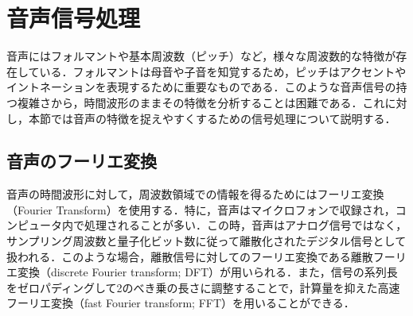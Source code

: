 \section{音声信号処理}
音声にはフォルマントや基本周波数（ピッチ）など，様々な周波数的な特徴が存在している．フォルマントは母音や子音を知覚するため，ピッチはアクセントやイントネーションを表現するために重要なものである．このような音声信号の持つ複雑さから，時間波形のままその特徴を分析することは困難である．これに対し，本節では音声の特徴を捉えやすくするための信号処理について説明する．

\subsection{音声のフーリエ変換}
音声の時間波形に対して，周波数領域での情報を得るためにはフーリエ変換（Fourier Transform）を使用する．特に，音声はマイクロフォンで収録され，コンピュータ内で処理されることが多い．この時，音声はアナログ信号ではなく，サンプリング周波数と量子化ビット数に従って離散化されたデジタル信号として扱われる．このような場合，離散信号に対してのフーリエ変換である離散フーリエ変換（discrete Fourier transform; DFT）が用いられる．また，信号の系列長をゼロパディングして2のべき乗の長さに調整することで，計算量を抑えた高速フーリエ変換（fast Fourier transform; FFT）を用いることができる．

